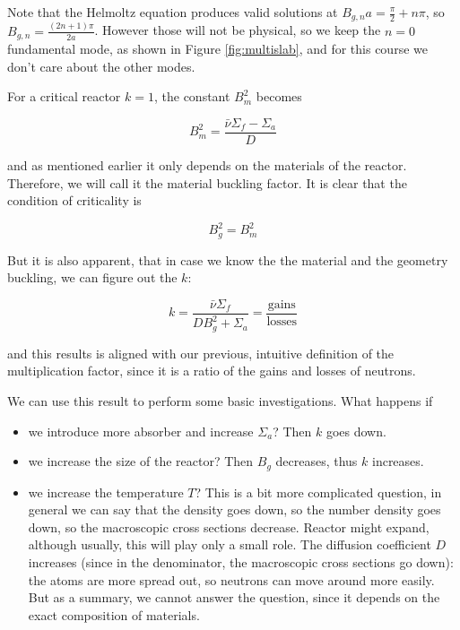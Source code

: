 Note that the Helmoltz equation produces valid solutions at $B_{g,n}a=\frac{\pi}{2}+n\pi$, so $B_{g,n}=\frac{(2n+1)\pi}{2a}$. However those will not be physical, so we keep the $n=0$ fundamental mode, as shown in Figure \ref{fig:multislab}, and for this course we don't care about the other modes.

For a critical reactor $k=1$, the constant $B_m^2$ becomes

$$B_m^2=\frac{\bar\nu\Sigma_f-\Sigma_a}{D}$$

\noindent and as mentioned earlier it only depends on the materials of the reactor. Therefore, we will call it the material buckling factor. It is clear that the condition of criticality is

\begin{equation}
B_g^2=B_m^2
\end{equation}

But it is also apparent, that in case we know the the material and the geometry buckling, we can figure out the $k$:

\begin{equation}
k=\frac{\bar\nu\Sigma_f}{DB_g^2+\Sigma_a}=\frac{\text{gains}}{\text{losses}}
\end{equation}

\noindent and this results is aligned with our previous, intuitive definition of the multiplication factor, since it is a ratio of the gains and losses of neutrons.

We can use this result to perform some basic investigations. What happens if

\begin{itemize}
\item we introduce more absorber and increase $\Sigma_a$? Then $k$ goes down.
\item we increase the size of the reactor? Then $B_g$ decreases, thus $k$ increases. 
\item we increase the temperature $T$? This is a bit more complicated question, in general we can say that the density goes down, so the number density goes down, so the macroscopic cross sections decrease. Reactor might expand, although usually, this will play only a small role. The diffusion coefficient $D$ increases (since in the denominator, the macroscopic cross sections go down): the atoms are more spread out, so neutrons can move around more easily. But as a summary, we cannot answer the question, since it depends on the exact composition of materials. 
\end{itemize}

